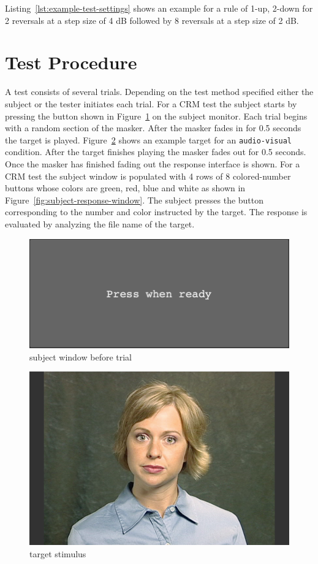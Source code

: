 \documentclass[11pt,pdftex,letterpaper]{article}
\begin{document}
Listing~\ref{lst:example-test-settings} shows an example for a rule of 1-up, 2-down for 2 reversals at a step size of 4 dB followed by 8 reversals at a step size of 2 dB.

\section{Test Procedure}
A test consists of several trials. Depending on the test method specified either the subject or the tester initiates each trial. For a CRM test the subject starts by pressing the button shown in Figure~\ref{fig:subject-ready-window} on the subject monitor. Each trial begins with a random section of the masker. After the masker fades in for 0.5 seconds the target is played. Figure~\ref{fig:target-stimulus} shows an example target for an \texttt{audio-visual} condition. After the target finishes playing the masker fades out for 0.5 seconds. Once the masker has finished fading out the response interface is shown. For a CRM test the subject window is populated with 4 rows of 8 colored-number buttons whose colors are green, red, blue and white as shown in Figure~\ref{fig:subject-response-window}. The subject presses the button corresponding to the number and color instructed by the target. The response is evaluated by analyzing the file name of the target.

\begin{figure}
\centering
\includegraphics[width = 0.9\linewidth]{subject-ready-window.png}
\caption{subject window before trial}
\label{fig:subject-ready-window}
\end{figure}

\begin{figure}
\centering
\includegraphics[width = 0.9\linewidth]{target-stimulus.png}
\caption{target stimulus}
\label{fig:target-stimulus}
\end{figure}
\end{document}
